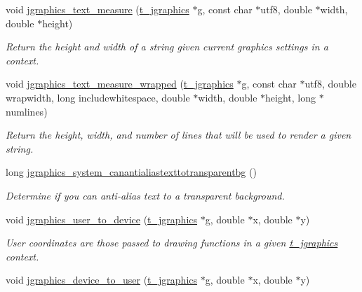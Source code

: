 \begin{DoxyCompactItemize}
void \hyperlink{group__jgraphics_ga3b8bb426e28bbc271f478ecc91f932f2}{jgraphics\_\-text\_\-measure} (\hyperlink{group__jgraphics_ga4bf27bd7e21a59a427481b909d4656e7}{t\_\-jgraphics} $\ast$g, const char $\ast$utf8, double $\ast$width, double $\ast$height)
\begin{DoxyCompactList}\small\item\em Return the height and width of a string given current graphics settings in a context. \item\end{DoxyCompactList}\item 
void \hyperlink{group__jgraphics_gabe6cf107005eed13953f624fac4a3e25}{jgraphics\_\-text\_\-measure\_\-wrapped} (\hyperlink{group__jgraphics_ga4bf27bd7e21a59a427481b909d4656e7}{t\_\-jgraphics} $\ast$g, const char $\ast$utf8, double wrapwidth, long includewhitespace, double $\ast$width, double $\ast$height, long $\ast$numlines)
\begin{DoxyCompactList}\small\item\em Return the height, width, and number of lines that will be used to render a given string. \item\end{DoxyCompactList}\item 
long \hyperlink{group__jgraphics_gaf794cabf13ac57d40f311bb415426925}{jgraphics\_\-system\_\-canantialiastexttotransparentbg} ()
\begin{DoxyCompactList}\small\item\em Determine if you can anti-\/alias text to a transparent background. \item\end{DoxyCompactList}\item 
void \hyperlink{group__jgraphics_ga67774b45773c5a559c756bd57167dd83}{jgraphics\_\-user\_\-to\_\-device} (\hyperlink{group__jgraphics_ga4bf27bd7e21a59a427481b909d4656e7}{t\_\-jgraphics} $\ast$g, double $\ast$x, double $\ast$y)
\begin{DoxyCompactList}\small\item\em User coordinates are those passed to drawing functions in a given \hyperlink{group__jgraphics_ga4bf27bd7e21a59a427481b909d4656e7}{t\_\-jgraphics} context. \item\end{DoxyCompactList}\item 
void \hyperlink{group__jgraphics_ga8a6b2b8982f78d417cb5a15a3fbdb2e2}{jgraphics\_\-device\_\-to\_\-user} (\hyperlink{group__jgraphics_ga4bf27bd7e21a59a427481b909d4656e7}{t\_\-jgraphics} $\ast$g, double $\ast$x, double $\ast$y)

\end{DoxyCompactItemize}
